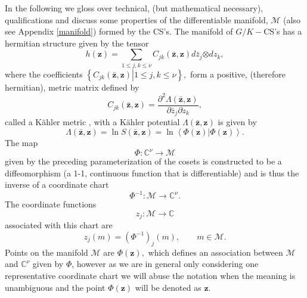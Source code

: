 \documentclass[aps,preprint]{revtex4}%
\begin{document}
In the following we gloss over technical, (but mathematical necessary),
qualifications and discuss some properties of the differentiable manifold,
$\mathcal{M}$ (also see Appendix \ref{manifold}) formed by the CS's. The
manifold of $G/K-$CS's has a hermitian structure \cite{Helgason} given by the
tensor
\begin{equation}
h\left(  \mathbf{z}\right)  =\sum_{1\leq j,k\leq\nu}C_{jk}\left(
\mathbf{\bar{z},z}\right)  d\bar{z}_{j}\mathbf{\otimes}dz_{k},
\end{equation}
where the coefficients $\left\{  \left.  C_{jk}\left(  \mathbf{\bar{z}%
,z}\right)  \right\vert 1\leq j,k\leq\nu\right\}  ,$ form a positive,
(therefore hermitian), metric matrix defined by
\begin{equation}
C_{jk}\left(  \mathbf{\bar{z},z}\right)  =\frac{\partial^{2}\Lambda\left(
\mathbf{\bar{z},z}\right)  }{\partial\bar{z}_{j}\partial z_{k}},
\end{equation}
called a K\"{a}hler metric \cite{DeWitt, Helgason}, with a K\"{a}hler
potential $\Lambda\left(  \mathbf{\bar{z},z}\right)  $ is given by%
\begin{equation}
\Lambda\left(  \mathbf{\bar{z},z}\right)  =\ln S\left(  \mathbf{\bar{z}%
,z}\right)  =\ln\left\langle \Phi\left(  \mathbf{z}\right)  |\Phi\left(
\mathbf{z}\right)  \right\rangle .
\end{equation}
The map
\begin{equation}
\Phi:\mathbb{C}^{\nu}\rightarrow\mathcal{M}%
\end{equation}
given by the preceding parameterization of the cosets is constructed to be a
diffeomorphism (a 1-1, continuous function that is differentiable) and is thus
the inverse of a coordinate chart \cite{Helgason}
\begin{equation}
\Phi^{-1}:\mathcal{M}\rightarrow\mathbb{C}^{\nu}.
\end{equation}
The coordinate functions
\begin{equation}
z_{j}:\mathcal{M}\rightarrow\mathbb{C}%
\end{equation}
associated with this chart are
\begin{equation}
z_{j}\left(  m\right)  =\left(  \Phi^{-1}\right)  _{j}\left(  m\right)
,\qquad m\in\mathcal{M}.
\end{equation}
Points on the manifold $\mathcal{M}$ are $\Phi\left(  \mathbf{z}\right)  ,$
which defines an association between $\mathcal{M}$ and $\mathbb{C}^{\nu}$
given by $\Phi$, however as we are in general only considering one
representative coordinate chart we will abuse the notation when the meaning is
unambiguous and the point $\Phi\left(  \mathbf{z}\right)  $ will be denoted as
$\mathbf{z}$.
\end{document}
